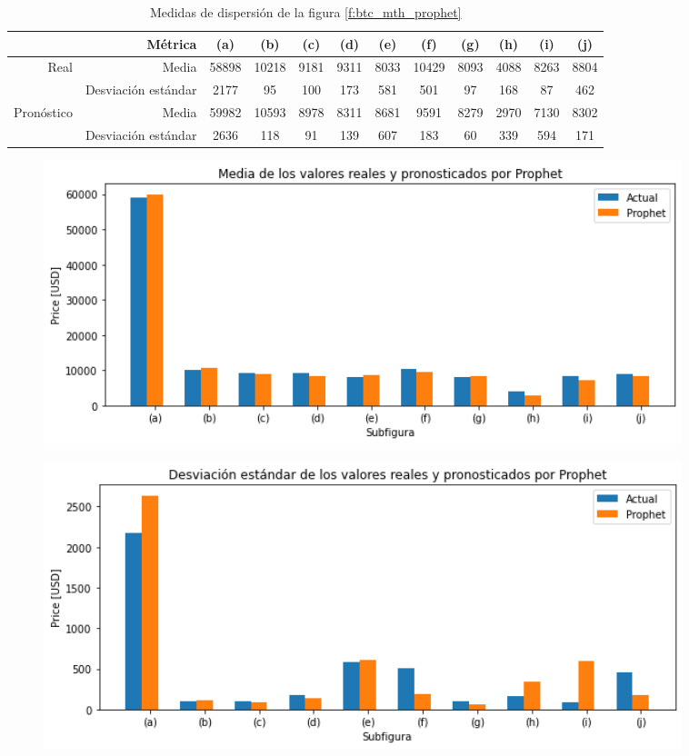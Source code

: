 \documentclass[a4paper,10pt]{article}
\begin{document}
\begin{table}[H]
 \begin{center}
 \resizebox{12cm}{!} {
  \begin{tabular}{|r|r|c|c|c|c|c|c|c|c|c|c|}
    & Métrica & (a) & (b) & (c) & (d) & (e) & (f) & (g) & (h) & (i) & (j) \\ \hline
    Real & Media & 58898 & 10218 & 9181 & 9311 & 8033 & 10429 & 8093 & 4088 & 8263 & 8804 \\
    & Desviación estándar & 2177 & 95 & 100 & 173 & 581 & 501 & 97 & 168 & 87 & 462 \\
    Pronóstico & Media & 59982 & 10593 & 8978 & 8311 & 8681 & 9591 & 8279 & 2970 & 7130 & 8302 \\
    & Desviación estándar & 2636 & 118 & 91 & 139 & 607 & 183 & 60 & 339 & 594 & 171 \\ \hline
  \end{tabular}
  }
  \caption{Medidas de dispersión de la figura \ref{f:btc_mth_prophet}}
  \label{tab:btc_mth_avestd_p}
 \end{center}
\end{table}

\begin{figure}[H]
\centering
\includegraphics[width=0.9\textwidth]{./plots/prophet/btc/month/ave}
\label{f:btc_ave_mh_p}
\end{figure}


\begin{figure}[H]
\centering
\includegraphics[width=0.9\textwidth]{./plots/prophet/btc/month/std}
\label{f:btc_std_mh_p}
\end{figure}
\end{document}
